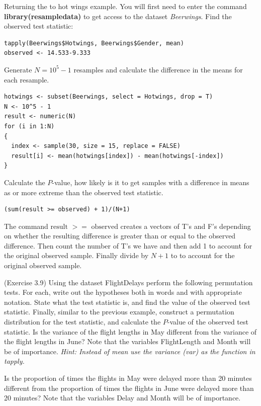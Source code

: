 \bb[resume]
\ii Returning the to hot wings example. You will first need to enter the command \textbf{library(resampledata)} to get access to the dataset \textit{Beerwings}.
\bb
\ii Find the observed test statistic:
\begin{lstlisting}
tapply(Beerwings$Hotwings, Beerwings$Gender, mean) 
observed <- 14.533-9.333
\end{lstlisting}
\ii Generate $N=10^5-1$ resamples and calculate the difference in the means for each resample.
\begin{lstlisting}
hotwings <- subset(Beerwings, select = Hotwings, drop = T)
N <- 10^5 - 1
result <- numeric(N)
for (i in 1:N)
{
  index <- sample(30, size = 15, replace = FALSE)
  result[i] <- mean(hotwings[index]) - mean(hotwings[-index])
}
\end{lstlisting}
\ii Calculate the $P$-value, how likely is it to get samples with a difference in means as or more extreme than the observed test
statistic.
\begin{lstlisting}
(sum(result >= observed) + 1)/(N+1)
\end{lstlisting}
\bi
\ii The command $\mbox{result } >= \mbox{ observed}$ creates a vectors of T's and F's depending on whether the resulting difference is greater than or equal to the observed difference.
\ii Then count the number of T's we have and then add 1 to account for the original observed sample.
\ii Finally divide by $N+1$ to to account for the original observed sample.
\ei
\ee
\ee

\clearpage


\bb[resume]
\ii (Exercise 3.9) Using the dataset FlightDelays perform the following permutation tests. For each, write out the hypotheses both in
words and with appropriate notation. State what the test statistic is, and find the value of the observed test statistic. Finally, similar to the previous example, construct a permutation distribution for the test statistic, and calculate the $P$-value of the observed test statistic.
\bb
\ii Is the variance of the flight lengths in May different from the variance of the flight lengths in June? Note that the variables FlightLength and Month will be of importance. \textit{Hint: Instead of mean use the variance (var) as the function in tapply.}

\vfill

\ii Is the proportion of times the flights in May were delayed more than 20 minutes different from the proportion of times the flights in June were delayed more than 20 minutes? Note that the variables Delay and Month will be of importance.

